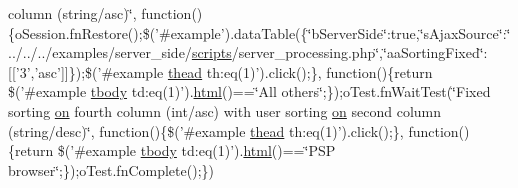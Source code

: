 \begin{DoxyCompactItemize}
column (string/asc)\char`\"{}, function()\{o\+Session.\+fn\+Restore();\$('\#example').data\+Table(\{\char`\"{}b\+Server\+Side\char`\"{}\+:true,\char`\"{}s\+Ajax\+Source\char`\"{}\+:\char`\"{}../../../examples/server\+\_\+side/\hyperlink{tinymce_8jquery_8dev_8js_a09066d4d580eeec222f858d588b4cdef}{scripts}/server\+\_\+processing.\+php\char`\"{},\char`\"{}aa\+Sorting\+Fixed\char`\"{}\+:\mbox{[}\mbox{[}'3','asc'\mbox{]}\mbox{]}\});\$('\#example \hyperlink{core_8constructor_8js_a856be760b6816c9591ce69f0a2b43693}{thead} th\+:eq(1)').click();\}, function()\{return \$('\#example \hyperlink{core_8constructor_8js_a99b0542c7c50fe8757c55bf9dac5f3be}{tbody} td\+:eq(1)').\hyperlink{tinymce_8jquery_8dev_8js_ac2090bcf2ff968c0083d5de53a6544f3}{html}()==\char`\"{}All others\char`\"{};\});o\+Test.\+fn\+Wait\+Test(\char`\"{}Fixed sorting \hyperlink{fullpage_2plugin_8min_8js_a1cfa98b7fed2aaf9fee3b68dbb7f9497}{on} fourth column (int/asc) with user sorting \hyperlink{fullpage_2plugin_8min_8js_a1cfa98b7fed2aaf9fee3b68dbb7f9497}{on} second column (string/desc)\char`\"{}, function()\{\$('\#example \hyperlink{core_8constructor_8js_a856be760b6816c9591ce69f0a2b43693}{thead} th\+:eq(1)').click();\}, function()\{return \$('\#example \hyperlink{core_8constructor_8js_a99b0542c7c50fe8757c55bf9dac5f3be}{tbody} td\+:eq(1)').\hyperlink{tinymce_8jquery_8dev_8js_ac2090bcf2ff968c0083d5de53a6544f3}{html}()==\char`\"{}P\+S\+P browser\char`\"{};\});o\+Test.\+fn\+Complete();\})
\end{DoxyCompactItemize}



